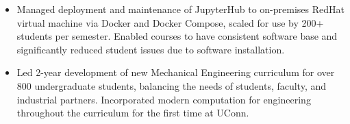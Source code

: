 \begin{itemize}
\item Managed deployment and maintenance of JupyterHub to on-premises RedHat virtual machine via Docker and Docker Compose, scaled for use by 200+ students per semester. Enabled courses to have consistent software base and significantly reduced student issues due to software installation.
\item Led 2-year development of new Mechanical Engineering curriculum for over 800 undergraduate students, balancing the needs of students, faculty, and industrial partners. Incorporated modern computation for engineering throughout the curriculum for the first time at UConn.
\end{itemize}
\sectionsep

\\
\\

